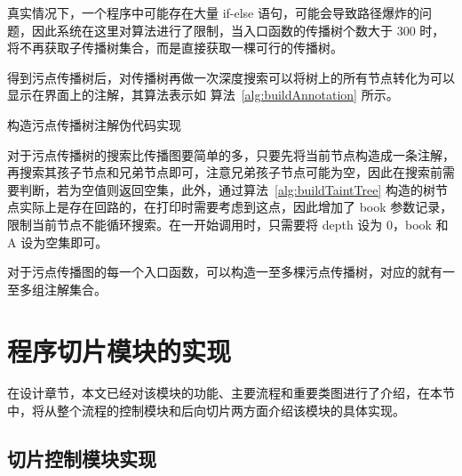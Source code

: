 真实情况下，一个程序中可能存在大量 if-else 语句，可能会导致路径爆炸的问题，因此系统在这里对算法进行了限制，当入口函数的传播树个数大于 300 时，将不再获取子传播树集合，而是直接获取一棵可行的传播树。

得到污点传播树后，对传播树再做一次深度搜索可以将树上的所有节点转化为可以显示在界面上的注解，其算法表示如 算法~\ref{alg:buildAnnotation} 所示。

\begin{algorithm}[!htb]\footnotesize
    \caption{构造污点传播树注解伪代码实现}
    \label{alg:buildAnnotation}
\end{algorithm}

对于污点传播树的搜索比传播图要简单的多，只要先将当前节点构造成一条注解，再搜索其孩子节点和兄弟节点即可，注意兄弟孩子节点可能为空，因此在搜索前需要判断，若为空值则返回空集，此外，通过算法~\ref{alg:buildTaintTree} 构造的树节点实际上是存在回路的，在打印时需要考虑到这点，因此增加了 book 参数记录，限制当前节点不能循环搜索。在一开始调用时，只需要将 depth 设为 0，book 和 A 设为空集即可。

对于污点传播图的每一个入口函数，可以构造一至多棵污点传播树，对应的就有一至多组注解集合。

\section{程序切片模块的实现}
在设计章节，本文已经对该模块的功能、主要流程和重要类图进行了介绍，在本节中，将从整个流程的控制模块和后向切片两方面介绍该模块的具体实现。

\subsection{切片控制模块实现}

